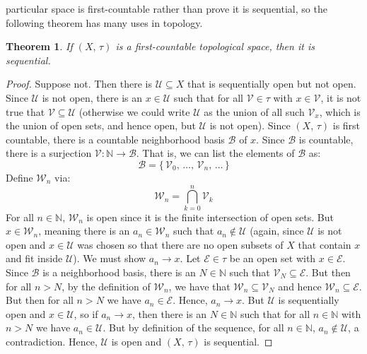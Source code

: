 \documentclass{article}
\theoremstyle{plain}
\newtheorem{theorem}{Theorem}[section]
\theoremstyle{normal}
\begin{document}
        particular space is first-countable rather than prove it is sequential,
        so the following theorem has many uses in topology.
        \begin{theorem}
            If $(X,\,\tau)$ is a first-countable topological space, then it is
            sequential.
        \end{theorem}
        \begin{proof}
            Suppose not. Then there is $\mathcal{U}\subseteq{X}$ that is
            sequentially open but not open. Since $\mathcal{U}$ is not open,
            there is an $x\in\mathcal{U}$ such that for all $\mathcal{V}\in\tau$
            with $x\in\mathcal{V}$, it is not true that
            $\mathcal{V}\subseteq\mathcal{U}$ (otherwise we could write
            $\mathcal{U}$ as the union of all such $\mathcal{V}_{x}$, which is
            the union of open sets, and hence open, but $\mathcal{U}$ is not
            open). Since $(X,\,\tau)$ is first countable, there is a countable
            neighborhood basis $\mathcal{B}$ of $x$. Since $\mathcal{B}$ is
            countable, there is a surjection
            $\mathcal{V}:\mathbb{N}\rightarrow\mathcal{B}$. That is, we can
            list the elements of $\mathcal{B}$ as:
            \begin{equation}
                \mathcal{B}=
                \{\,\mathcal{V}_{0},\,\dots,\,\mathcal{V}_{n},\,\dots\,\}
            \end{equation}
            Define $\mathcal{W}_{n}$ via:
            \begin{equation}
                \mathcal{W}_{n}=\bigcap_{k=0}^{n}\mathcal{V}_{k}
            \end{equation}
            For all $n\in\mathbb{N}$, $\mathcal{W}_{n}$ is open since it is
            the finite intersection of open sets. But $x\in\mathcal{W}_{n}$,
            meaning there is an $a_{n}\in\mathcal{W}_{n}$ such that
            $a_{n}\notin\mathcal{U}$ (again, since $\mathcal{U}$ is not open
            and $x\in\mathcal{U}$ was chosen so that there are no open subsets
            of $X$ that contain $x$ and fit inside $\mathcal{U}$). We must
            show $a_{n}\rightarrow{x}$. Let
            $\mathcal{E}\in\tau$ be an open set with $x\in\mathcal{E}$. Since
            $\mathcal{B}$ is a neighborhood basis, there is an
            $N\in\mathbb{N}$ such that $\mathcal{V}_{N}\subseteq\mathcal{E}$.
            But then for all $n>N$, by the definition of $\mathcal{W}_{n}$,
            we have that $\mathcal{W}_{n}\subseteq\mathcal{V}_{N}$ and hence
            $\mathcal{W}_{n}\subseteq\mathcal{E}$. But then for all $n>N$ we
            have $a_{n}\in\mathcal{E}$. Hence, $a_{n}\rightarrow{x}$. But
            $\mathcal{U}$ is sequentially open and $x\in\mathcal{U}$, so if
            $a_{n}\rightarrow{x}$, then there is an $N\in\mathbb{N}$ such that
            for all $n\in\mathbb{N}$ with $n>N$ we have $a_{n}\in\mathcal{U}$.
            But by definition of the sequence, for all $n\in\mathbb{N}$,
            $a_{n}\notin\mathcal{U}$, a contradiction. Hence,
            $\mathcal{U}$ is open and $(X,\,\tau)$ is sequential.
        \end{proof}
\end{document}
